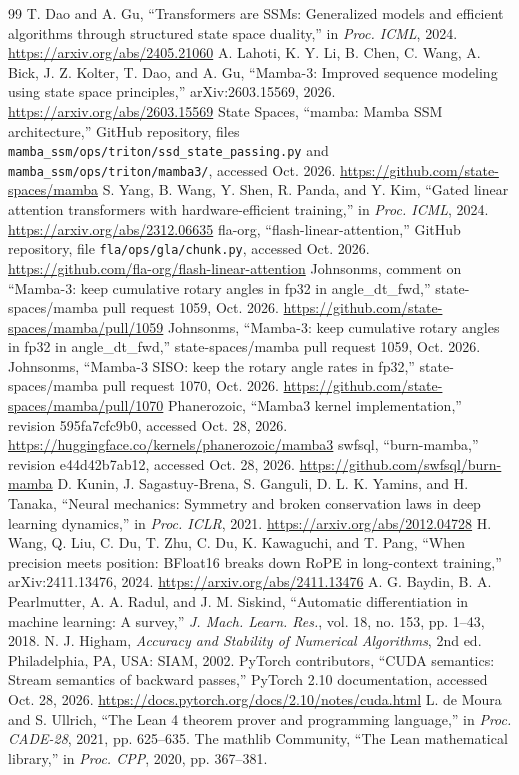 \begin{thebibliography}{99}
 T. Dao and A. Gu, ``Transformers are SSMs: Generalized models and efficient algorithms through structured state space duality,'' in \emph{Proc. ICML}, 2024. \url{https://arxiv.org/abs/2405.21060}
 A. Lahoti, K. Y. Li, B. Chen, C. Wang, A. Bick, J. Z. Kolter, T. Dao, and A. Gu, ``Mamba-3: Improved sequence modeling using state space principles,'' arXiv:2603.15569, 2026. \url{https://arxiv.org/abs/2603.15569}
 State Spaces, ``mamba: Mamba SSM architecture,'' GitHub repository, files \texttt{mamba\_ssm/ops/triton/ssd\_state\_passing.py} and \texttt{mamba\_ssm/ops/triton/mamba3/}, accessed Oct. 2026. \url{https://github.com/state-spaces/mamba}
 S. Yang, B. Wang, Y. Shen, R. Panda, and Y. Kim, ``Gated linear attention transformers with hardware-efficient training,'' in \emph{Proc. ICML}, 2024. \url{https://arxiv.org/abs/2312.06635}
 fla-org, ``flash-linear-attention,'' GitHub repository, file \texttt{fla/ops/gla/chunk.py}, accessed Oct. 2026. \url{https://github.com/fla-org/flash-linear-attention}
 Johnsonms, comment on ``Mamba-3: keep cumulative rotary angles in fp32 in angle\_dt\_fwd,'' state-spaces/mamba pull request 1059, Oct. 2026. \url{https://github.com/state-spaces/mamba/pull/1059}
 Johnsonms, ``Mamba-3: keep cumulative rotary angles in fp32 in angle\_dt\_fwd,'' state-spaces/mamba pull request 1059, Oct. 2026.
 Johnsonms, ``Mamba-3 SISO: keep the rotary angle rates in fp32,'' state-spaces/mamba pull request 1070, Oct. 2026. \url{https://github.com/state-spaces/mamba/pull/1070}
 Phanerozoic, ``Mamba3 kernel implementation,'' revision 595fa7cfc9b0, accessed Oct. 28, 2026. \url{https://huggingface.co/kernels/phanerozoic/mamba3}
 swfsql, ``burn-mamba,'' revision e44d42b7ab12, accessed Oct. 28, 2026. \url{https://github.com/swfsql/burn-mamba}
 D. Kunin, J. Sagastuy-Brena, S. Ganguli, D. L. K. Yamins, and H. Tanaka, ``Neural mechanics: Symmetry and broken conservation laws in deep learning dynamics,'' in \emph{Proc. ICLR}, 2021. \url{https://arxiv.org/abs/2012.04728}
 H. Wang, Q. Liu, C. Du, T. Zhu, C. Du, K. Kawaguchi, and T. Pang, ``When precision meets position: BFloat16 breaks down RoPE in long-context training,'' arXiv:2411.13476, 2024. \url{https://arxiv.org/abs/2411.13476}
 A. G. Baydin, B. A. Pearlmutter, A. A. Radul, and J. M. Siskind, ``Automatic differentiation in machine learning: A survey,'' \emph{J. Mach. Learn. Res.}, vol. 18, no. 153, pp. 1--43, 2018.
 N. J. Higham, \emph{Accuracy and Stability of Numerical Algorithms}, 2nd ed. Philadelphia, PA, USA: SIAM, 2002.
 PyTorch contributors, ``CUDA semantics: Stream semantics of backward passes,'' PyTorch 2.10 documentation, accessed Oct. 28, 2026. \url{https://docs.pytorch.org/docs/2.10/notes/cuda.html}
 L. de Moura and S. Ullrich, ``The Lean 4 theorem prover and programming language,'' in \emph{Proc. CADE-28}, 2021, pp. 625--635.
 The mathlib Community, ``The Lean mathematical library,'' in \emph{Proc. CPP}, 2020, pp. 367--381.
\end{thebibliography}
